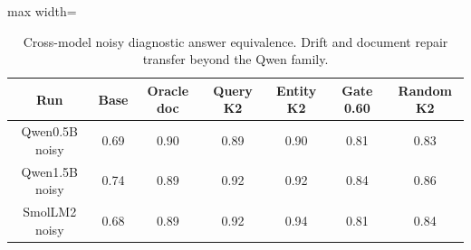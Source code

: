 \begin{table}[t]
\centering
\footnotesize
\begin{adjustbox}{max width=\textwidth}
\begin{tabular}{ccccccc}
\toprule
Run & Base & Oracle doc & Query K2 & Entity K2 & Gate 0.60 & Random K2 \\
\midrule
Qwen0.5B noisy & 0.69 & 0.90 & 0.89 & 0.90 & 0.81 & 0.83 \\
Qwen1.5B noisy & 0.74 & 0.89 & 0.92 & 0.92 & 0.84 & 0.86 \\
SmolLM2 noisy & 0.68 & 0.89 & 0.92 & 0.94 & 0.81 & 0.84 \\
\bottomrule
\end{tabular}
\end{adjustbox}
\caption{Cross-model noisy diagnostic answer equivalence. Drift and document repair transfer beyond the Qwen family.}
\label{tab:crossmodel}\end{table}
